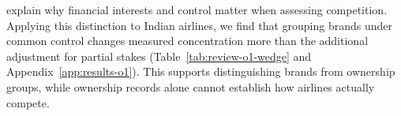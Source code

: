 \textcite{obriensalop2000} explain why financial interests and control matter when assessing competition. Applying this distinction to Indian airlines, we find that grouping brands under common control changes measured concentration more than the additional adjustment for partial stakes (Table~\ref{tab:review-o1-wedge} and Appendix~\ref{app:results-o1}). This supports distinguishing brands from ownership groups, while ownership records alone cannot establish how airlines actually compete.
